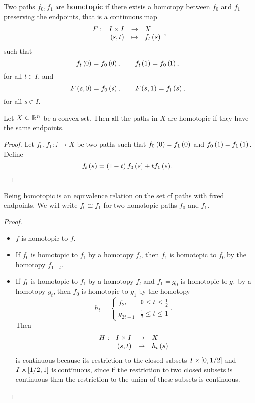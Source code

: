 \begin{definition*}
Two paths $ f_0, f_1 $ are \textbf{homotopic} if there exists a homotopy between $ f_0 $ and $ f_1 $ preserving the endpoints, that is a continuous map
$$ \function[F]{I \times I}{X}{\rb{s, t}}{f_t\rb{s}}, $$
such that
$$ f_t\rb{0} = f_0\rb{0}, \qquad f_t\rb{1} = f_0\rb{1}, $$
for all $ t \in I $, and
$$ F\rb{s, 0} = f_0\rb{s}, \qquad F\rb{s, 1} = f_1\rb{s}, $$
for all $ s \in I $.
\end{definition*}

\begin{example*}
Let $ X \subseteq \R^n $ be a convex set. Then all the paths in $ X $ are homotopic if they have the same endpoints.
\end{example*}

\begin{proof}
Let $ f_0, f_1 : I \to X $ be two paths such that $ f_0\rb{0} = f_1\rb{0} $ and $ f_0\rb{1} = f_1\rb{1} $. Define
$$ f_t\rb{s} = \rb{1 - t}f_0\rb{s} + tf_1\rb{s}. $$
\end{proof}

\begin{lemma}
Being homotopic is an equivalence relation on the set of paths with fixed endpoints. We will write $ f_0 \cong f_1 $ for two homotopic paths $ f_0 $ and $ f_1 $.
\end{lemma}

\begin{proof}
\hfill
\begin{itemize}
\item $ f $ is homotopic to $ f $.
\item If $ f_0 $ is homotopic to $ f_1 $ by a homotopy $ f_t $, then $ f_1 $ is homotopic to $ f_0 $ by the homotopy $ f_{1 - t} $.
\item If $ f_0 $ is homotopic to $ f_1 $ by a homotopy $ f_t $ and $ f_1 = g_0 $ is homotopic to $ g_1 $ by a homotopy $ g_t $, then $ f_0 $ is homotopic to $ g_1 $ by the homotopy
$$ h_t =
\begin{cases}
f_{2t} & 0 \le t \le \tfrac{1}{2} \\
g_{2t - 1} & \tfrac{1}{2} \le t \le 1
\end{cases}.
$$
Then
$$ \function[H]{I \times I}{X}{\rb{s, t}}{h_t\rb{s}} $$
is continuous because its restriction to the closed subsets $ I \times \sb{0, 1 / 2} $ and $ I \times \sb{1 / 2, 1} $ is continuous, since if the restriction to two closed subsets is continuous then the restriction to the union of these subsets is continuous.
\end{itemize}
\end{proof}

